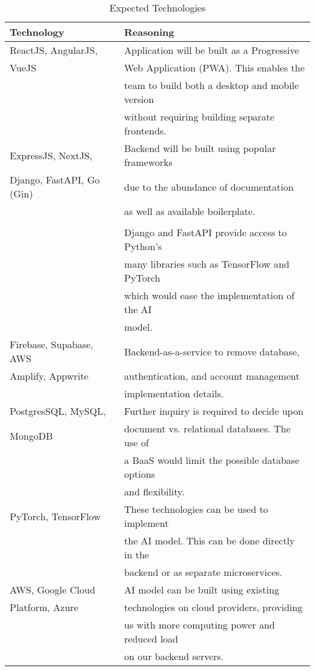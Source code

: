 \documentclass[12pt, titlepage]{article}
\begin{document}
\begin{table}[H]
\caption{Expected Technologies}
\label{tab:expected-tech}
\begin{tabular}{|l|l|}
\hline
\textbf{Technology} & \textbf{Reasoning} \\ \hline
ReactJS, AngularJS, & Application will be built as a Progressive \\ 
VueJS & Web Application (PWA). This enables the \\
& team to build both a desktop and mobile version  \\
& without requiring building separate frontends. \\
\hline
ExpressJS, NextJS, & Backend will be built using popular frameworks\\
Django, FastAPI, Go (Gin) & due to the abundance of documentation \\
& as well as available boilerplate. \\
& \\
& Django and FastAPI provide access to Python’s \\
& many libraries such as TensorFlow and PyTorch \\
& which would ease the implementation of the AI \\ 
& model.\\
\hline 
Firebase, Supabase, AWS & Backend-as-a-service to remove database, \\
Amplify, Appwrite & authentication, and account management  \\
& implementation details. \\
\hline
PostgresSQL, MySQL, & Further inquiry is required to decide upon \\
MongoDB &  document vs. relational databases. The use of \\
& a BaaS would limit the possible database options \\
& and flexibility. \\
\hline
PyTorch, TensorFlow & These technologies can be used to implement \\
& the AI model. This can be done directly in the  \\
& backend or as separate microservices. \\
\hline
AWS, Google Cloud & AI model can be built using existing \\ 
Platform, Azure & technologies on cloud providers, providing \\ 
& us with more computing power and reduced load \\ 
& on our backend servers. \\

\end{tabular}
\end{table}
\end{document}
